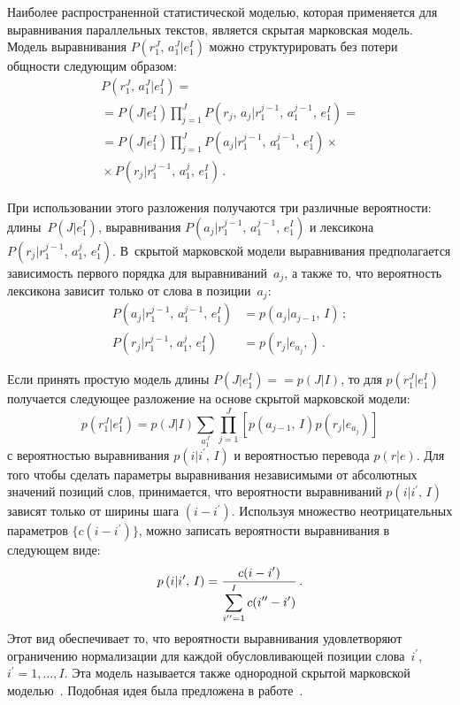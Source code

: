\begin{multicols}{2}
     Наиболее распространенной статистической моделью, которая 
применяется для выравнивания параллельных текстов, является скрытая 
марковская модель. Модель выравнивания $P(r_1^J,\,a_1^J\vert e_1^I)$ 
можно структурировать без потери общности следующим образом:
     \begin{multline*}
     P\left( r_1^J,\,a_1^J\vert e_1^I\right) ={}\\
     {}=P\left(J\vert 
e_1^I\right)\prod\limits_{j=1}^J P\left(r_j,\,a_j\vert r_1^{j-1},\,a_1^{j-
1},\,e_1^I\right)={}\\
     {}=P\left(J\vert e_1^I\right)\prod\limits_{j=1}^J P\left(a_j\vert r_1^{j-
1},\,a_1^{j-1},\,e_1^I\right) \times{}\\
{}\times P\left( r_j\vert r_1^{j-1},\,a_1^j,\,e_1^I\right)\,.
     \end{multline*}
     
     При использовании этого разложения получаются три различные 
вероятности:  длины~$P(J\vert e_1^I)$,  
выравнивания $P(a_j\vert r_1^{j-1},\,a_1^{j-1},\,e_1^I)$ и  
лексикона $P(r_j\vert r_1^{j-1},\,a_1^j,\,e_1^I)$. В~скрытой марковской 
модели выравнивания предполагается зависимость первого порядка для 
выравниваний~$a_j$, а также то, что вероятность лексикона зависит только 
от слова в позиции~$a_j$:
     \begin{align*}
     P\left(a_j\vert r_1^{j-1},\,a_1^{j-1},\,e_1^I\right) &=p\left(a_j\vert a_{j-
1},\,I\right)\,;\\[6pt]
     P\left(r_j\vert r_1^{j-1},\,a_1^{j},\,e_1^I\right) &=p\left(r_j\vert 
e_{a_j},\right)\,.
     \end{align*}
     
     Если принять простую модель длины $P(J\vert e_1^I)=$\linebreak $=p(J\vert I)$, то для 
$p(r_1^J\vert e_1^I)$ получается следующее разложение на основе скрытой 
марковской модели:
     \begin{equation*}
     p\left( r_1^J\vert e_1^I\right) =p\left(J\vert 
I\right)\sum\limits_{a_1^J}\prod\limits_{j=1}^J \left [p\left( a_{j-1},\,I\right)
p\left(r_j\vert e_{a_j}\right)\right]
     \end{equation*}
с вероятностью выравнивания $p(i\vert i^\prime,\,I)$ и вероятностью перевода 
$p(r\vert e)$. Для того чтобы сделать параметры выравнивания независимыми 
от абсолютных значений позиций слов, принимается, что вероятности 
выравниваний $p(i\vert i^\prime,\,I)$ зависят только от ширины шага $(i-
i^\prime)$. Используя множество не\-от\-ри\-ца\-тель\-ных параметров $\{c(i-
i^\prime)\}$, можно записать вероятности выравнивания в следующем виде:
\begin{equation*}
p\left(i\vert i^\prime,\,I\right) =\displaystyle\frac{\displaystyle c(i-
i^\prime)\mathstrut}{\displaystyle \sum\limits^I_{i^{\prime\prime}=1} c(i^{\prime\prime}-i^\prime)\mathstrut}\,.
\end{equation*}
Этот вид обеспечивает то, что вероятности выравнивания удовлетворяют 
ограничению нормализации для каждой обусловливающей позиции 
слова~$i^\prime$, $i^\prime=1,\ldots ,I$. Эта модель называется также 
однородной скрытой марковской моделью~\cite{12koz}. Подобная идея была 
предложена в работе~\cite{17koz}.
     

\end{multicols}
